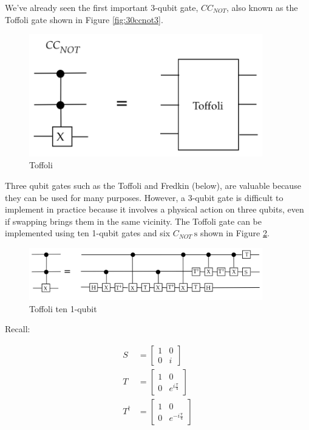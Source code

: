 \documentclass[main.tex]{subfiles}
\begin{document}
    We've already seen the first important 3-qubit gate, $C C_{N O T}$, also known as the Toffoli gate shown in Figure \ref{fig:30ccnot3}.
    
    \begin{figure}
        \centering
        \includegraphics[width=4in]{notes/figs/n08/31toffoli.png}
        \caption{Toffoli}
        \label{fig:31toffoli}
    \end{figure}
    
    Three qubit gates such as the Toffoli and Fredkin (below), are valuable because they can be used for many purposes. However, a 3-qubit gate is difficult to implement in practice because it involves a physical action on three qubits, even if swapping brings them in the same vicinity. The Toffoli gate can be implemented using ten 1-qubit gates and six $C_{NOT} \mathrm{~s}$ shown in Figure \ref{fig:32toffoli2}.
    
    \begin{figure}
        \centering
        \includegraphics[width=4in]{notes/figs/n08/32toffoli2.png}
        \caption{Toffoli ten 1-qubit}
        \label{fig:32toffoli2}
    \end{figure}
    
    Recall:
    
    $$
    \begin{aligned}
    S &=\left[\begin{array}{ll}
    1 & 0 \\
    0 & i
    \end{array}\right] \\
    T &=\left[\begin{array}{cc}
    1 & 0 \\
    0 & e^{i \frac{\pi}{4}}
    \end{array}\right] \\
    T^{\dagger} &=\left[\begin{array}{cc}
    1 & 0 \\
    0 & e^{-i \frac{\pi}{4}}
    \end{array}\right]
    \end{aligned}
    $$
    
\end{document}
